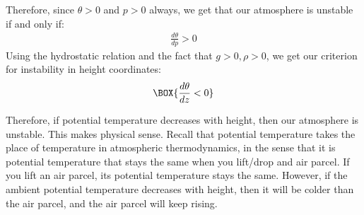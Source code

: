 Therefore, since $\theta>0$ and $p>0$ always, we get that our atmosphere is unstable if and only if:
\begin{align}\label{Dry Stability Potential Temperature}
    \boxed{\frac{d\theta}{dp}>0}
\end{align}
Using the hydrostatic relation and the fact that $g>0,\rho>0$, we get our criterion for instability in height coordinates:
\begin{align}
    \BOX{\frac{d\theta}{dz}<0}
\end{align}

Therefore, if potential temperature decreases with height, then our atmosphere is unstable. This makes physical sense. Recall that potential temperature takes the place of temperature in atmospheric thermodynamics, in the sense that it is potential temperature that stays the same when you lift/drop and air parcel. If you lift an air parcel, its potential temperature stays the same. However, if the ambient potential temperature decreases with height, then it will be colder than the air parcel, and the air parcel will keep rising. 

